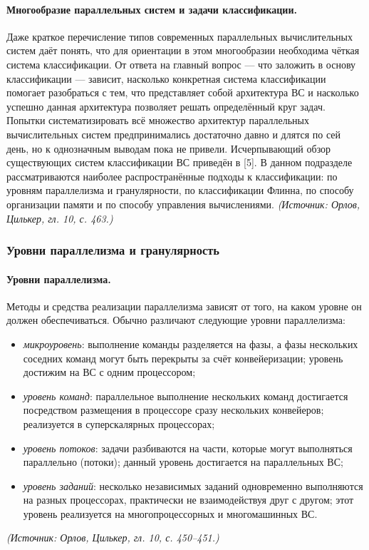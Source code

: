 \documentclass[a4paper,12pt]{article}
\begin{document}
\paragraph{Многообразие параллельных систем и задачи классификации.}
Даже краткое перечисление типов современных параллельных вычислительных систем даёт понять, что для ориентации в этом многообразии необходима чёткая система классификации. От ответа на главный вопрос — что заложить в основу классификации — зависит, насколько конкретная система классификации помогает разобраться с тем, что представляет собой архитектура ВС и насколько успешно данная архитектура позволяет решать определённый круг задач. Попытки систематизировать всё множество архитектур параллельных вычислительных систем предпринимались достаточно давно и длятся по сей день, но к однозначным выводам пока не привели. Исчерпывающий обзор существующих систем классификации ВС приведён в [5]. В данном подразделе рассматриваются наиболее распространённые подходы к классификации: по уровням параллелизма и гранулярности, по классификации Флинна, по способу организации памяти и по способу управления вычислениями.
\textit{(Источник: Орлов, Цилькер, гл. 10, с. 463.)}

\subsubsection{Уровни параллелизма и гранулярность}

\paragraph{Уровни параллелизма.}
Методы и средства реализации параллелизма зависят от того, на каком уровне он должен обеспечиваться. Обычно различают следующие уровни параллелизма:
\begin{itemize}
\item \emph{микроуровень}: выполнение команды разделяется на фазы, а фазы нескольких соседних команд могут быть перекрыты за счёт конвейеризации; уровень достижим на ВС с одним процессором;
\item \emph{уровень команд}: параллельное выполнение нескольких команд достигается посредством размещения в процессоре сразу нескольких конвейеров; реализуется в суперскалярных процессорах;
\item \emph{уровень потоков}: задачи разбиваются на части, которые могут выполняться параллельно (потоки); данный уровень достигается на параллельных ВС;
\item \emph{уровень заданий}: несколько независимых заданий одновременно выполняются на разных процессорах, практически не взаимодействуя друг с другом; этот уровень реализуется на многопроцессорных и многомашинных ВС.
\end{itemize}
\textit{(Источник: Орлов, Цилькер, гл. 10, с. 450--451.)}
\end{document}
